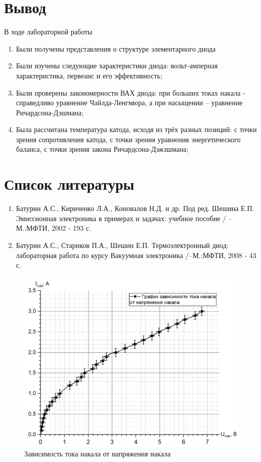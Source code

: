 \documentclass[a4paper]{article}
\begin{document}
\section{Вывод}

В ходе лабораторной работы
\begin{enumerate}
    \item Были получены представления о структуре элементарного диода

    \item Были изучены следующие характеристики диода: вольт-амперная характеристика, первеанс и его эффективность;

    \item Были проверены закономерности ВАХ диода: при больших токах накала - справедливо уравнение Чайлда-Ленгмюра, а при насыщении – уравнение Ричардсона-Дэшмана;

    \item Была рассчитана температура катода, исходя из трёх разных позиций: с точки зрения сопротивления катода, с точки зрения уравнения энергетического баланса, с точки зрения закона Ричардсона-Дэжзшмана;

\end{enumerate}

\section{Список литературы}
\begin{enumerate}
    \item Батурин А.С., Кириченко Л.А., Коновалов Н.Д. и др. Под ред. Шешина Е.П. Эмиссионная электроника в примерах и задачах: учебное пособие / --М.:МФТИ, 2002 - 193 с. 
    \item Батурин А.С., Стариков П.А., Шешин Е.П. Термоэлектронный диод: лабораторная работа по курсу Вакуумная электроника /--М.:МФТИ, 2008 - 43 с.
\end{enumerate}

\newpage

\begin{figure}[h]
\begin{center}
\includegraphics[width=13cm]{fig1.png}
\caption{Зависимость тока накала от напряжения накала}
\end{center}
\end{figure}
\end{document}
